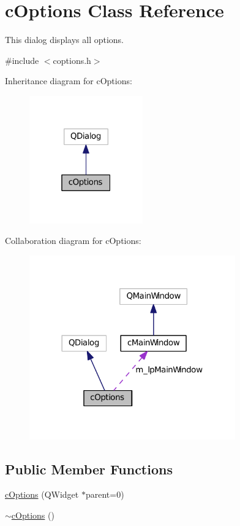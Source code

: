 \hypertarget{classc_options}{}\section{c\+Options Class Reference}
\label{classc_options}


This dialog displays all options.  




{\ttfamily \#include $<$coptions.\+h$>$}



Inheritance diagram for c\+Options\+:
\nopagebreak
\begin{figure}[H]
\begin{center}
\leavevmode
\includegraphics[width=139pt]{classc_options__inherit__graph}
\end{center}
\end{figure}


Collaboration diagram for c\+Options\+:
\nopagebreak
\begin{figure}[H]
\begin{center}
\leavevmode
\includegraphics[width=252pt]{classc_options__coll__graph}
\end{center}
\end{figure}
\subsection*{Public Member Functions}
\begin{DoxyCompactItemize}
\item 
\hyperlink{classc_options_ab10e5433e2eb0ea7ca3ea65746e3c132}{c\+Options} (Q\+Widget $\ast$parent=0)
\item 
\hyperlink{classc_options_a7bf237a91867bc8875ee3b09cdfa3d1c}{$\sim$c\+Options} ()
\end{DoxyCompactItemize}
